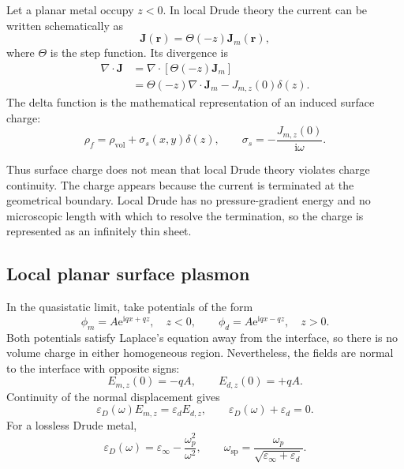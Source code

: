 \documentclass[11pt,a4paper]{article}
\newcommand{\J}{\mathbf J}
\newcommand{\ee}{\mathrm e}
\newcommand{\ii}{\mathrm i}
\newcommand{\eps}{\varepsilon}
\newcommand{\epsinf}{\varepsilon_\infty}
\newcommand{\epsd}{\varepsilon_d}
\newcommand{\omegap}{\omega_p}
\begin{document}
Let a planar metal occupy \(z<0\).  In local Drude theory the current can be
written schematically as
\begin{equation}
    \J(\mathbf r)=\Theta(-z)\J_m(\mathbf r),
    \label{eq:step-current}
\end{equation}
where \(\Theta\) is the step function.  Its divergence is
\begin{align}
    \nabla\!\cdot\!\J
    &=\nabla\!\cdot\!\left[\Theta(-z)\J_m\right]\\
    &=\Theta(-z)\nabla\!\cdot\!\J_m
      -J_{m,z}(0)\delta(z).
    \label{eq:step-current-divergence}
\end{align}
The delta function is the mathematical representation of an induced surface
charge:
\begin{equation}
    \rho_f=\rho_{\mathrm{vol}}+\sigma_s(x,y)\delta(z),
    \qquad
    \sigma_s=-\frac{J_{m,z}(0)}{\ii\omega}.
    \label{eq:local-surface-charge}
\end{equation}

Thus surface charge does not mean that local Drude theory violates charge
continuity.  The charge appears because the current is terminated at the
geometrical boundary.  Local Drude has no pressure-gradient energy and no
microscopic length with which to resolve the termination, so the charge is
represented as an infinitely thin sheet.

\subsection{Local planar surface plasmon}

In the quasistatic limit, take potentials of the form
\begin{equation}
    \phi_m=A\ee^{\ii qx+qz},\quad z<0,
    \qquad
    \phi_d=A\ee^{\ii qx-qz},\quad z>0.
    \label{eq:surface-potentials}
\end{equation}
Both potentials satisfy Laplace's equation away from the interface, so there
is no volume charge in either homogeneous region.  Nevertheless, the fields
are normal to the interface with opposite signs:
\begin{equation}
    E_{m,z}(0)=-qA,
    \qquad
    E_{d,z}(0)=+qA.
    \label{eq:surface-normal-fields}
\end{equation}
Continuity of the normal displacement gives
\begin{equation}
    \eps_D(\omega)E_{m,z}=\epsd E_{d,z},
    \qquad
    \boxed{\eps_D(\omega)+\epsd=0.}
    \label{eq:local-surface-plasmon-condition}
\end{equation}
For a lossless Drude metal,
\begin{equation}
    \eps_D(\omega)=\epsinf-\frac{\omegap^2}{\omega^2},
    \qquad
    \omega_{\mathrm{sp}}
    =\frac{\omegap}{\sqrt{\epsinf+\epsd}}.
    \label{eq:surface-plasmon-frequency}
\end{equation}
\end{document}
